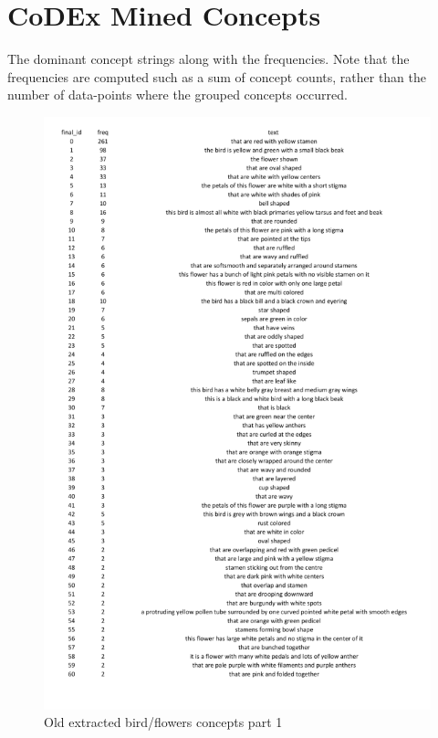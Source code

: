 \chapter{CoDEx Mined Concepts}
\label{codex-mined-concepts}

The dominant concept strings along with the frequencies.
Note that the frequencies are computed such as a sum of concept counts, rather than the number of data-points where the grouped concepts occurred.

\begin{figure}[h]
\caption{Old extracted bird/flowers concepts part 1}
\centering
\includegraphics[width=\textwidth]{appendix/birds_old1.png}
\end{figure}

